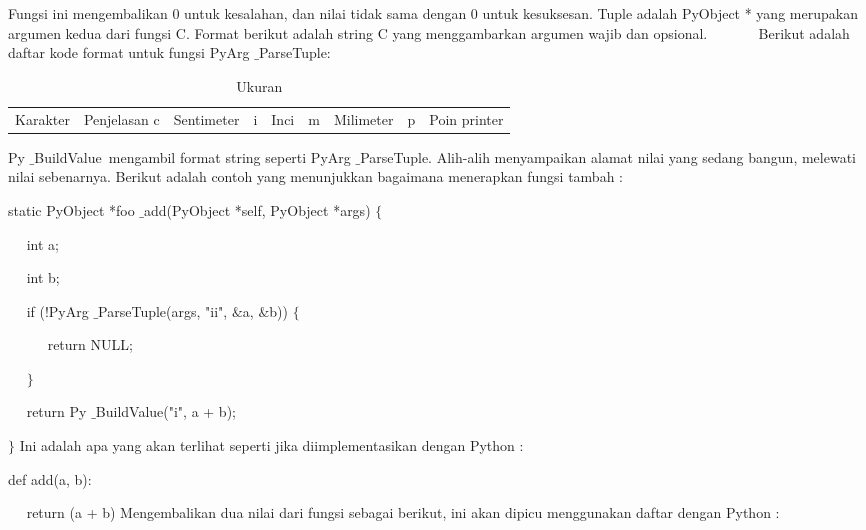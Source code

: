  \hspace*{0.5in} Fungsi ini mengembalikan 0 untuk kesalahan, dan nilai tidak sama dengan 0 untuk kesuksesan. Tuple adalah PyObject * yang merupakan argumen kedua dari fungsi C. Format berikut adalah string C yang menggambarkan argumen wajib dan opsional.\vspace{\baselineskip}
~~~~~~ Berikut adalah daftar kode format untuk fungsi PyArg $  \_  $ParseTuple: 




\begin{table}[ht]
	\caption{Ukuran}
	\begin{tabular*}{\textwidth}{@{\extracolsep{\fill}}lcc}
		\hline
		Karakter&  Penjelasan \cr
		\hline
		c&Sentimeter&\cr
		i&Inci&\cr
		m&Milimeter&\cr
		p&Poin printer\cr
		\hline
	\end{tabular*}
	\begin{tablenotes}
	\end{tablenotes}
\end{table}



\vspace{12pt}
\vspace{14pt}
Py $  \_  $BuildValue~mengambil format string seperti PyArg $  \_  $ParseTuple. Alih-alih menyampaikan alamat nilai yang sedang  bangun, melewati nilai sebenarnya. Berikut adalah contoh yang menunjukkan bagaimana menerapkan fungsi tambah : 

static PyObject *foo $  \_  $add(PyObject *self, PyObject *args)  $  \{  $ 

~~ int a; 

~~ int b; 
\vspace{12pt}

~~ if (!PyArg $  \_  $ParseTuple(args, "ii",  $  \&  $a,  $  \&  $b))  $  \{  $ 

~~~~~ return NULL;

~~  $  \}  $ 

~~ return Py $  \_  $BuildValue("i", a + b); 

 $  \}  $ 
\vspace{14pt}
Ini adalah apa yang akan terlihat seperti jika diimplementasikan dengan Python : 

def add(a, b):

~~ return (a + b) 
\vspace{16pt}
Mengembalikan dua nilai dari fungsi sebagai berikut, ini akan dipicu menggunakan daftar dengan Python :

